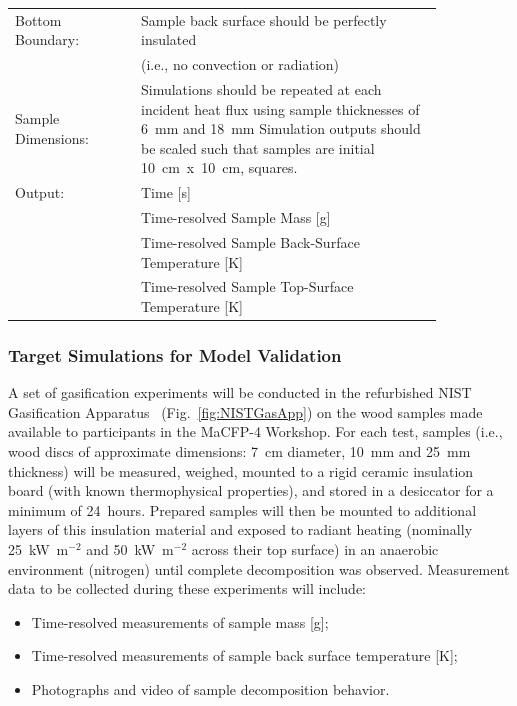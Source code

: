 \documentclass[12pt]{article}
\begin{document}
\begin{table}[t!]
\begin{tabular}{p{0.25\linewidth} p{0.6\linewidth}}
Bottom Boundary: & Sample back surface should be perfectly insulated \\
& (i.e., no convection or radiation)\\
Sample Dimensions: & Simulations should be repeated at each incident heat flux using sample thicknesses of 6~mm and 18~mm
Simulation outputs should be scaled such that samples are initial 10~cm~x~10~cm, squares.\\
Output: & Time [s]\\
& Time-resolved Sample Mass [g]\\
& Time-resolved Sample Back-Surface Temperature [K]\\
& Time-resolved Sample Top-Surface Temperature [K]\\
\hline
\end{tabular}
\end{table}


\clearpage
\subsubsection{Target Simulations for Model Validation}
A set of gasification experiments will be conducted in the refurbished NIST Gasification Apparatus~\cite{DeLannoyeTechnote, NISTIR6041} (Fig.~\ref{fig:NISTGasApp}) on the wood samples made available to participants in the MaCFP-4 Workshop. For each test, samples (i.e., wood discs of approximate dimensions: 7~cm diameter, 10~mm and 25~mm thickness) will be measured, weighed, mounted to a rigid ceramic insulation board (with known thermophysical properties), and stored in a desiccator for a minimum of 24~hours. Prepared samples will then be mounted to additional layers of this insulation material and exposed to radiant heating (nominally 25~kW~m$^{-2}$ and 50~kW~m$^{-2}$ across their top surface) in an anaerobic environment (nitrogen) until complete decomposition was observed. Measurement data to be collected during these experiments will include:
\vspace{-5pt}
\begin{itemize}[noitemsep]
\item Time-resolved measurements of sample mass [g];
\item Time-resolved measurements of sample back surface temperature [K];
\item Photographs and video of sample decomposition behavior.
\end{itemize}
\end{document}
